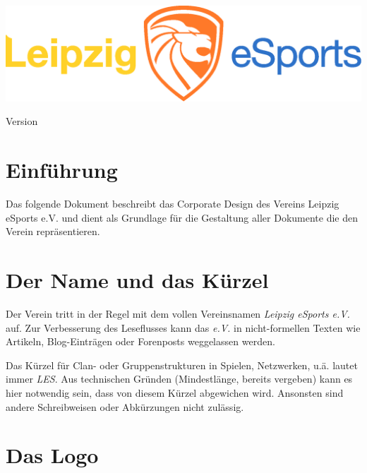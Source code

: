 \documentclass{article}
\begin{document}
\begin{titlepage}
\vspace*{\fill}
\title{\titel}
\author{\autor}
\includegraphics[width=\textwidth]{Docs/Logo.eps}
{\let\newpage\relax\maketitle}
\begin{center}
Version \version
\end{center}
\vspace*{\fill}
\end{titlepage}

\cleardoublepage

\tableofcontents

\cleardoublepage
\section{Einführung}

Das folgende Dokument beschreibt das Corporate Design des Vereins Leipzig eSports e.V. und dient als Grundlage für die Gestaltung aller Dokumente die den Verein repräsentieren.

\section{Der Name und das Kürzel}

Der Verein tritt in der Regel mit dem vollen Vereinsnamen \emph{Leipzig eSports e.V.} auf. Zur Verbesserung des Leseflusses kann das \emph{e.V.} in nicht-formellen Texten wie Artikeln, Blog-Einträgen oder Forenposts weggelassen werden.

Das Kürzel für Clan- oder Gruppenstrukturen in Spielen, Netzwerken, u.ä. lautet immer \emph{LES}. Aus technischen Gründen (Mindestlänge, bereits vergeben) kann es hier notwendig sein, dass von diesem Kürzel abgewichen wird. Ansonsten sind andere Schreibweisen oder Abkürzungen nicht zulässig.

\section{Das Logo}
\end{document}
